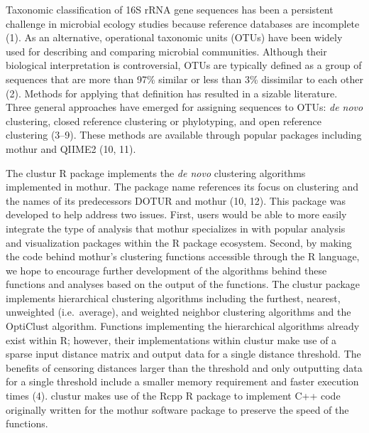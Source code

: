 \documentclass[
  11pt,
]{article}
\begin{document}
Taxonomic classification of 16S rRNA gene sequences has been a
persistent challenge in microbial ecology studies because reference
databases are incomplete (1). As an alternative, operational taxonomic
units (OTUs) have been widely used for describing and comparing
microbial communities. Although their biological interpretation is
controversial, OTUs are typically defined as a group of sequences that
are more than 97\% similar or less than 3\% dissimilar to each other
(2). Methods for applying that definition has resulted in a sizable
literature. Three general approaches have emerged for assigning
sequences to OTUs: \emph{de novo} clustering, closed reference
clustering or phylotyping, and open reference clustering (3--9). These
methods are available through popular packages including mothur and
QIIME2 (10, 11).

The clustur R package implements the \emph{de novo} clustering
algorithms implemented in mothur. The package name references its focus
on clustering and the names of its predecessors DOTUR and mothur (10,
12). This package was developed to help address two issues. First, users
would be able to more easily integrate the type of analysis that mothur
specializes in with popular analysis and visualization packages within
the R package ecosystem. Second, by making the code behind mothur's
clustering functions accessible through the R language, we hope to
encourage further development of the algorithms behind these functions
and analyses based on the output of the functions. The clustur package
implements hierarchical clustering algorithms including the furthest,
nearest, unweighted (i.e.~average), and weighted neighbor clustering
algorithms and the OptiClust algorithm. Functions implementing the
hierarchical algorithms already exist within R; however, their
implementations within clustur make use of a sparse input distance
matrix and output data for a single distance threshold. The benefits of
censoring distances larger than the threshold and only outputting data
for a single threshold include a smaller memory requirement and faster
execution times (4). clustur makes use of the Rcpp R package to
implement C++ code originally written for the mothur software package to
preserve the speed of the functions.
\end{document}

